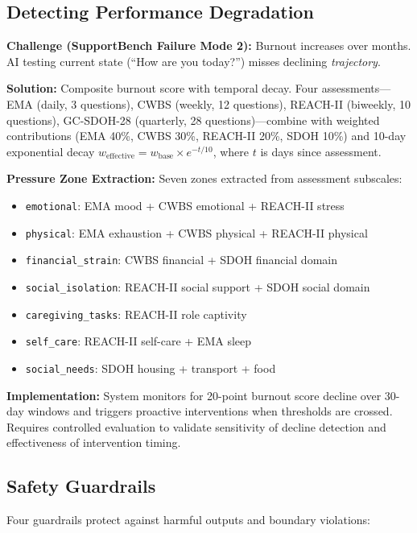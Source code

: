 \documentclass{article}
\begin{document}
%
\subsection{Detecting Performance Degradation}%
\label{subsec:DetectingPerformanceDegradation}%
\textbf{Challenge (SupportBench Failure Mode 2):} Burnout increases over months. AI testing current state (``How are you today?'') misses declining \textit{trajectory}.

\textbf{Solution:} Composite burnout score with temporal decay. Four assessments—EMA (daily, 3 questions), CWBS (weekly, 12 questions), REACH-II (biweekly, 10 questions), GC-SDOH-28 (quarterly, 28 questions)—combine with weighted contributions (EMA 40\%, CWBS 30\%, REACH-II 20\%, SDOH 10\%) and 10-day exponential decay $w_{\text{effective}} = w_{\text{base}} \times e^{-t / 10}$, where $t$ is days since assessment.

\textbf{Pressure Zone Extraction:} Seven zones extracted from assessment subscales:
\begin{itemize}
    \item \texttt{emotional}: EMA mood + CWBS emotional + REACH-II stress
    \item \texttt{physical}: EMA exhaustion + CWBS physical + REACH-II physical
    \item \texttt{financial\_strain}: CWBS financial + SDOH financial domain
    \item \texttt{social\_isolation}: REACH-II social support + SDOH social domain
    \item \texttt{caregiving\_tasks}: REACH-II role captivity
    \item \texttt{self\_care}: REACH-II self-care + EMA sleep
    \item \texttt{social\_needs}: SDOH housing + transport + food
\end{itemize}

\textbf{Implementation:} System monitors for 20-point burnout score decline over 30-day windows and triggers proactive interventions when thresholds are crossed. Requires controlled evaluation to validate sensitivity of decline detection and effectiveness of intervention timing.

%
\subsection{Safety Guardrails}%
\label{subsec:SafetyGuardrails}%

Four guardrails protect against harmful outputs and boundary violations:
\end{document}
